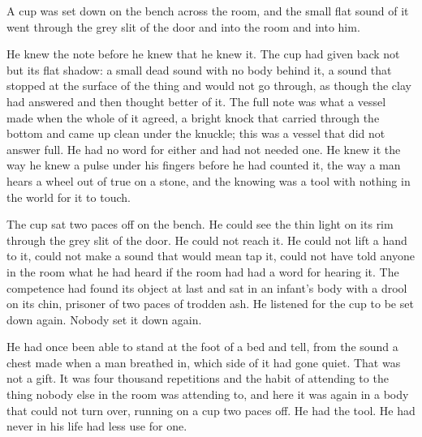 A cup was set down on the bench across the room, and the small flat sound of it went through the grey slit of the door and into the room and into him.

He knew the note before he knew that he knew it. The cup had given back not  but its flat shadow: a small dead sound with no body behind it, a sound that stopped at the surface of the thing and would not go through, as though the clay had answered and then thought better of it. The full note was what a vessel made when the whole of it agreed, a bright knock that carried through the bottom and came up clean under the knuckle; this was a vessel that did not answer full. He had no  word for either and had not needed one. He knew it the way he knew a pulse under his fingers before he had counted it, the way a man hears a wheel out of true on a stone, and the knowing was a tool with nothing in the world for it to touch.

The cup sat two paces off on the bench. He could see the thin light on its rim through the grey slit of the door. He could not reach it. He could not lift a hand to it, could not make a sound that would mean tap it, could not have told anyone in the room what he had heard if the room had had a word for hearing it. The competence had found its object at last and sat in an infant's body with a drool on its chin, prisoner of two paces of trodden ash. He listened for the cup to be set down again. Nobody set it down again.

He had once been able to stand at the foot of a bed and tell, from the sound a chest made when a man breathed in, which side of it had gone quiet. That was not a gift. It was four thousand repetitions and the habit of attending to the thing nobody else in the room was attending to, and here it was again in a body that could not turn over, running on a cup two paces off. He had the tool. He had never in his life had less use for one.

\scenebreak

